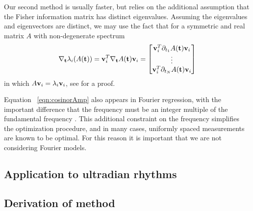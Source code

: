 \documentclass{article}
\begin{document}
Our second method is usually faster, but relies on the additional assumption that the Fisher information matrix has distinct eigenvalues. Assuming the eigenvalues and eigenvectors are distinct, we may use the fact that for a symmetric and real matrix $A$ with non-degenerate spectrum
\begin{align}
    \nabla_{\mathbf{t}} \lambda_{i} (A(\mathbf{t})) = \mathbf{v}_{i}^T \nabla_{\mathbf{t}} A(\mathbf{t}) \mathbf{v}_i = \begin{bmatrix}
         \mathbf{v}_{i}^T \partial_{t_{1}}  A(\mathbf{t}) \mathbf{v}_i\\
         \vdots \\
         \mathbf{v}_{i}^T \partial_{t_{N}}  A(\mathbf{t}) \mathbf{v}_i
    \end{bmatrix}\label{eqn:grad}
\end{align}
in which $A\mathbf{v}_{i} = \lambda_i \mathbf{v}_{i}$, see \cite{horn2012matrix} for a proof.

Equation ~\eqref{eqn:cosinorAmp} also appears in Fourier regression, with the important difference that the frequency must be an integer multiple of the fundamental frequency \cite{Fourier1,Fourier2,Fourier3}. This additional constraint on the frequency simplifies the optimization procedure, and in many cases, uniformly spaced measurements are known to be optimal. For this reason it is important that we are not considering Fourier models. 


\subsection{Application to ultradian rhythms}


\subsection{Derivation of method}\label{sec:derivmeth}
\end{document}
